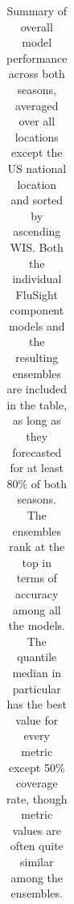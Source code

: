 \documentclass[
]{article}
\begin{document}
\begin{longtable}[]{@{}
  >{\raggedright\arraybackslash}p{}
  >{\raggedleft\arraybackslash}p{}
  >{\raggedleft\arraybackslash}p{}
  >{\raggedleft\arraybackslash}p{}
  >{\raggedleft\arraybackslash}p{}
  >{\raggedleft\arraybackslash}p{}
  >{\raggedleft\arraybackslash}p{}@{}}

\caption{\label{tbl-overall-evaluation}Summary of overall model
performance across both seasons, averaged over all locations except the
US national location and sorted by ascending WIS. Both the individual
FluSight component models and the resulting ensembles are included in
the table, as long as they forecasted for at least 80\% of both seasons.
The ensembles rank at the top in terms of accuracy among all the models.
The quantile median in particular has the best value for every metric
except 50\% coverage rate, though metric values are often quite similar
among the ensembles.}

\tabularnewline


\end{longtable}
\end{document}
